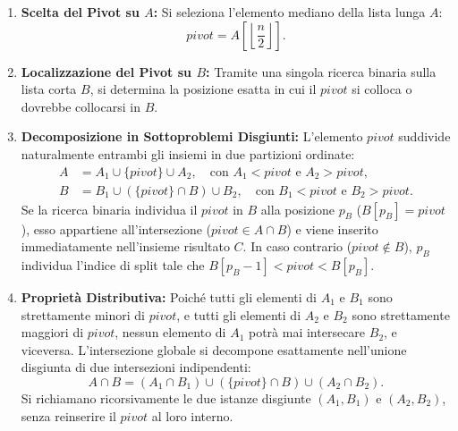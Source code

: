 \begin{enumerate}
  \item \textbf{Scelta del Pivot su $A$:} Si seleziona l'elemento mediano della lista lunga $A$:
  \begin{equation}
    pivot = A\left[\left\lfloor \frac{n}{2} \right\rfloor\right].
  \end{equation}
  \item \textbf{Localizzazione del Pivot su $B$:} Tramite una singola ricerca binaria sulla lista corta $B$, si determina la posizione esatta in cui il $pivot$ si colloca o dovrebbe collocarsi in $B$.
  \item \textbf{Decomposizione in Sottoproblemi Disgiunti:} L'elemento $pivot$ suddivide naturalmente entrambi gli insiemi in due partizioni ordinate:
  \begin{align}
    A &= A_1 \cup \{pivot\} \cup A_2, \quad \text{con } A_1 < pivot \text{ e } A_2 > pivot, \\
    B &= B_1 \cup (\{pivot\} \cap B) \cup B_2, \quad \text{con } B_1 < pivot \text{ e } B_2 > pivot.
  \end{align}
  Se la ricerca binaria individua il $pivot$ in $B$ alla posizione $p_B$ ($B[p_B] = pivot$), esso appartiene all'intersezione ($pivot \in A \cap B$) e viene inserito immediatamente nell'insieme risultato $C$. In caso contrario ($pivot \notin B$), $p_B$ individua l'indice di split tale che $B[p_B-1] < pivot < B[p_B]$.
  \item \textbf{Propriet\`a Distributiva:} Poich\'e tutti gli elementi di $A_1$ e $B_1$ sono strettamente minori di $pivot$, e tutti gli elementi di $A_2$ e $B_2$ sono strettamente maggiori di $pivot$, nessun elemento di $A_1$ potr\`a mai intersecare $B_2$, e viceversa. L'intersezione globale si decompone esattamente nell'unione disgiunta di due intersezioni indipendenti:
  \begin{equation}
    A \cap B = (A_1 \cap B_1) \cup (\{pivot\} \cap B) \cup (A_2 \cap B_2).
  \end{equation}
  Si richiamano ricorsivamente le due istanze disgiunte $(A_1, B_1)$ e $(A_2, B_2)$, senza reinserire il $pivot$ al loro interno.
\end{enumerate}

